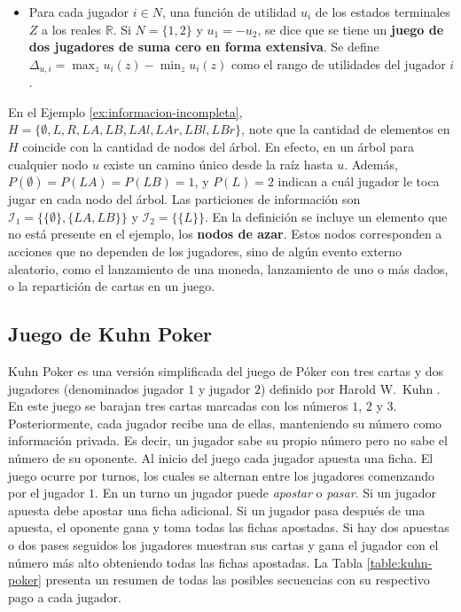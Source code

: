 \begin{definition}
\begin{itemize}[]
  \item Para cada jugador $i \in N$, una función de utilidad $u_i$ de los estados terminales $Z$ a los reales $\mathbb{R}$. Si $N = \{1,2\}$ y $u_1 = -u_2$, se dice que se tiene un \textbf{juego de dos jugadores de suma cero en forma extensiva}. Se define $\Delta_{u,i} = \max_z u_i(z) - \min_z u_i(z)$ como el rango de utilidades del jugador $i$.
\end{itemize}
\end{definition}

En el Ejemplo \ref{ex:informacion-incompleta}, $H = \{ \emptyset, L, R, LA, LB, LAl, LAr, LBl, LBr\}$, note que la cantidad de elementos en $H$ coincide con la cantidad de nodos del árbol. En efecto, en un árbol para cualquier nodo $u$ existe un camino único desde la raíz hasta $u$. Además, $P(\emptyset) = P(LA) = P(LB) = 1$, y $P(L) = 2$ indican a cuál jugador le toca jugar en cada nodo del árbol. Las particiones de información son $\mathcal{I}_1 = \{\{\emptyset\}, \{LA, LB\}\}$ y $\mathcal{I}_2  = \{\{L\}\}$. En la definición se incluye un elemento que no está presente en el ejemplo, los \textbf{nodos de azar}. Estos nodos corresponden a acciones que no dependen de los jugadores, sino de algún evento externo aleatorio, como el lanzamiento de una moneda, lanzamiento de uno o más dados, o la repartición de cartas en un juego.

\subsection*{Juego de Kuhn Poker}
\label{section:kuhn-poker}

Kuhn Poker es una versión simplificada del juego de Póker con tres cartas y dos jugadores (denominados jugador $1$ y jugador $2$) definido por Harold W.\ Kuhn \cite{bib:kuhn-poker}. En este juego se barajan tres cartas marcadas con los números $1$, $2$ y $3$. Posteriormente, cada jugador recibe una de ellas, manteniendo su número como información privada. Es decir, un jugador sabe su propio número pero no sabe el número de su oponente. Al inicio del juego cada jugador apuesta una ficha. El juego ocurre por turnos, los cuales se alternan entre los jugadores comenzando por el jugador $1$. En un turno un jugador puede \textit{apostar} o \textit{pasar}. Si un jugador apuesta debe apostar una ficha adicional. Si un jugador pasa después de una apuesta, el oponente gana y toma todas las fichas apostadas. Si hay dos apuestas o dos pases seguidos los jugadores muestran sus cartas y gana el jugador con el número más alto obteniendo todas las fichas apostadas. La Tabla \ref{table:kuhn-poker} presenta un resumen de todas las posibles secuencias con su respectivo pago a cada jugador.

